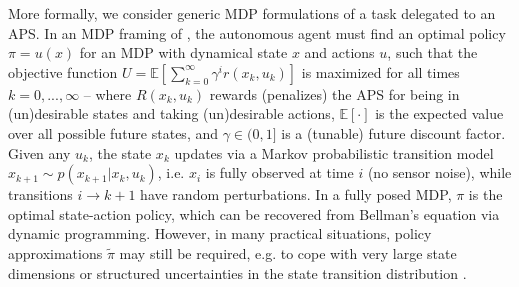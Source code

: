 More formally, we consider generic MDP formulations of a task \taks{} delegated to an APS. In an MDP framing of \task{}, the autonomous agent must find an optimal policy $\pi = u(x)$ for an MDP with dynamical state $x$ and actions $u$, such that the objective function
$U = \mathbb{E} \left[\sum_{k=0}^{\infty} \gamma^i r(x_k,u_k) \right]$ is maximized for all times $k=0,...,\infty$ --  
where $R(x_k,u_k)$ rewards (penalizes) the APS for being in (un)desirable states and taking (un)desirable actions, $\mathbb{E}[\cdot]$ is the expected value over all possible future states, and $\gamma \in (0,1]$ is a (tunable) future discount factor. 
Given any $u_k$, the state $x_k$ updates via a Markov probabilistic transition model $x_{k+1} \sim p(x_{k+1}|x_{k},u_{k})$,  
i.e. $x_{i}$ is fully observed at time $i$ (no sensor noise), while transitions $i\rightarrow k+1$ have random perturbations.
In a fully posed MDP, $\pi$ is the optimal state-action policy, which can be recovered from Bellman's equation via dynamic programming. 
However, in many practical situations, policy approximations $\tilde{\pi}$ may still be required, e.g. to cope with very large state dimensions or structured uncertainties in the state transition distribution \cite{KochenderferBook}. 

